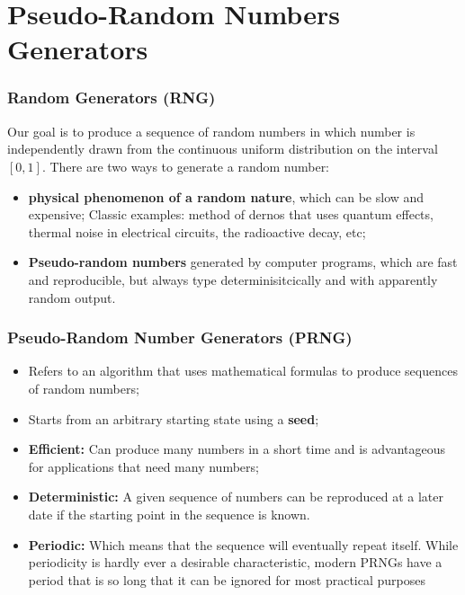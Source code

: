 



\section{Pseudo-Random Numbers Generators}


\begin{frame}
    \frametitle{Random Generators (RNG)}

    Our goal is to produce a sequence of random numbers in which number is
    independently drawn from the continuous uniform distribution on the interval
    $[0,1]$. There are two ways to generate a random number:

    \begin{itemize}

        \item \textbf{physical phenomenon of a random nature}, which can be slow and expensive;
        Classic examples: method of dernos that uses quantum effects, thermal noise in electrical circuits, 
        the radioactive decay, etc;

        \item \textbf{Pseudo-random numbers} generated by computer programs, which are fast and 
        reproducible, but always type determinisitcically and with apparently random output. 
   
    \end{itemize}
\end{frame}

\begin{frame}
    \frametitle{Pseudo-Random Number Generators (PRNG)}

    \begin{itemize}

        \item Refers to an algorithm that uses mathematical formulas to produce 
        sequences of random numbers;
        \item Starts from an arbitrary starting state using a \textbf{seed}; 

        \item \textbf{Efficient:} Can produce many numbers in a short time and is advantageous for 
        applications that need many numbers;

        \item \textbf{Deterministic:} A given sequence of numbers can be reproduced at a 
        later date if the starting point in the sequence is known.

        \item \textbf{Periodic:} Which means that the sequence will eventually repeat itself. 
        While periodicity is hardly ever a desirable characteristic, modern PRNGs have a period that is so long that it can be ignored for most practical purposes
    \end{itemize}
\end{frame}




